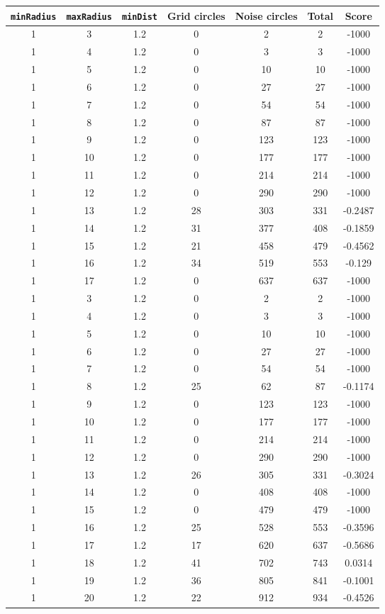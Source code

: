 \documentclass[letterpaper, 12pt]{article}
\begin{document}
\begin{longtable}{|c|c|c|c|c|c|c|}
\hline
\textbf{\texttt{minRadius}} & \textbf{\texttt{maxRadius}} & \textbf{\texttt{minDist}} & \textbf{Grid circles} & \textbf{Noise circles} & \textbf{Total} & \textbf{Score} \\
\hline
1 & 3 & 1.2 & 0 & 2 & 2 & -1000 \\
\hline
1 & 4 & 1.2 & 0 & 3 & 3 & -1000 \\
\hline
1 & 5 & 1.2 & 0 & 10 & 10 & -1000 \\
\hline
1 & 6 & 1.2 & 0 & 27 & 27 & -1000 \\
\hline
1 & 7 & 1.2 & 0 & 54 & 54 & -1000 \\
\hline
1 & 8 & 1.2 & 0 & 87 & 87 & -1000 \\
\hline
1 & 9 & 1.2 & 0 & 123 & 123 & -1000 \\
\hline
1 & 10 & 1.2 & 0 & 177 & 177 & -1000 \\
\hline
1 & 11 & 1.2 & 0 & 214 & 214 & -1000 \\
\hline
1 & 12 & 1.2 & 0 & 290 & 290 & -1000 \\
\hline
1 & 13 & 1.2 & 28 & 303 & 331 & -0.2487 \\
\hline
1 & 14 & 1.2 & 31 & 377 & 408 & -0.1859 \\
\hline
1 & 15 & 1.2 & 21 & 458 & 479 & -0.4562 \\
\hline
1 & 16 & 1.2 & 34 & 519 & 553 & -0.129 \\
\hline
1 & 17 & 1.2 & 0 & 637 & 637 & -1000 \\
\hline
1 & 3 & 1.2 & 0 & 2 & 2 & -1000 \\
\hline
1 & 4 & 1.2 & 0 & 3 & 3 & -1000 \\
\hline
1 & 5 & 1.2 & 0 & 10 & 10 & -1000 \\
\hline
1 & 6 & 1.2 & 0 & 27 & 27 & -1000 \\
\hline
1 & 7 & 1.2 & 0 & 54 & 54 & -1000 \\
\hline
1 & 8 & 1.2 & 25 & 62 & 87 & -0.1174 \\
\hline
1 & 9 & 1.2 & 0 & 123 & 123 & -1000 \\
\hline
1 & 10 & 1.2 & 0 & 177 & 177 & -1000 \\
\hline
1 & 11 & 1.2 & 0 & 214 & 214 & -1000 \\
\hline
1 & 12 & 1.2 & 0 & 290 & 290 & -1000 \\
\hline
1 & 13 & 1.2 & 26 & 305 & 331 & -0.3024 \\
\hline
1 & 14 & 1.2 & 0 & 408 & 408 & -1000 \\
\hline
1 & 15 & 1.2 & 0 & 479 & 479 & -1000 \\
\hline
1 & 16 & 1.2 & 25 & 528 & 553 & -0.3596 \\
\hline
1 & 17 & 1.2 & 17 & 620 & 637 & -0.5686 \\
\hline
1 & 18 & 1.2 & 41 & 702 & 743 & 0.0314 \\
\hline
1 & 19 & 1.2 & 36 & 805 & 841 & -0.1001 \\
\hline
1 & 20 & 1.2 & 22 & 912 & 934 & -0.4526 \\
\hline
\end{longtable}
\end{document}
